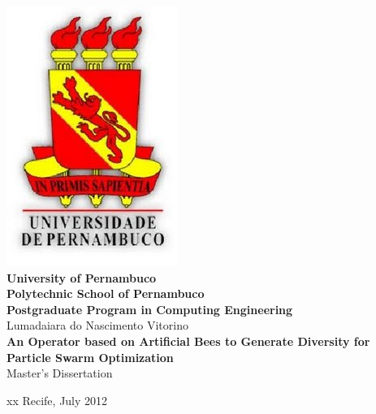 \begin{titlepage}

  \begin{center}
  \includegraphics[scale=0.2]{image/UPE_brasao}\\
  \textbf{University of Pernambuco}\\
  \textbf{Polytechnic School of Pernambuco}\\
  \textbf{Postgraduate Program in Computing Engineering}\\[3cm]

    Lumadaiara do Nascimento Vitorino\\[2cm]


    {\large \textbf{An Operator based on Artificial Bees to Generate Diversity for Particle Swarm Optimization}}\\[3cm]

    Master's Dissertation\\[2cm]
  \end{center}


\begin{center}
  {\color{white} xx}\vfill
  Recife, July 2012
\end{center}

\end{titlepage}
